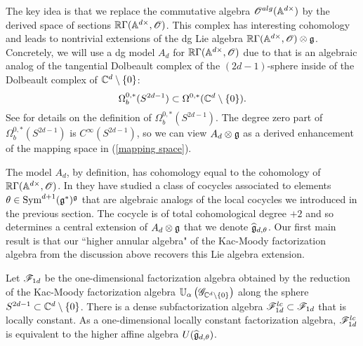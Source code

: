 \documentclass[10pt]{amsart}
\begin{document}
The key idea is that we replace the commutative algebra $\mathscr O^{alg}(\mathbb A^{d\times})$ by the derived space of sections $\mathbb R \Gamma(\mathbb A^{d \times}, \mathscr O)$. 
This complex has interesting cohomology and leads to nontrivial extensions of the dg Lie algebra $\mathbb R \Gamma(\mathbb A^{d \times}, \mathscr O) \otimes \mathfrak g$. 
Concretely, we will use a dg model $A_d$ for $\mathbb R \Gamma(\mathbb A^{d \times}, \mathscr O)$ due to \cite{FHK} that is an algebraic analog of the tangential Dolbeault complex of the $(2d-1)$-sphere inside of the Dolbeault complex of $\mathbb C^d \setminus \{0\}$:
\[
\Omega_b^{0,*}(S^{2d-1}) \subset \Omega^{0,*}(\mathbb C^d\setminus \{0\}) .
\]
See \cite{DragomirTomassini} for details on the definition of $\Omega_b^{0,*}(S^{2d-1})$. 
The degree zero part of $\Omega_b^{0,*}(S^{2d-1})$ is $C^\infty(S^{2d-1})$, so we can view $A_d \otimes \mathfrak g$ as a derived enhancement of the mapping space in (\ref{mapping space}). 

The model $A_d$, by definition, has cohomology equal to the cohomology of $\mathbb R \Gamma(\mathbb A^{d \times}, \mathscr O)$. 
In \cite{FHK} they have studied a class of cocycles associated to elements $\theta \in {\rm Sym}^{d+1}(\mathfrak g^*)^\mathfrak g$ that are algebraic analogs of the local cocycles we introduced in the previous section. 
The cocycle is of total cohomological degree $+2$ and so determines a central extension of $A_d \otimes \mathfrak g$ that we denote $\widehat{\mathfrak g}_{d,\theta}$. 
Our first main result is that our ``higher annular algebra" of the Kac-Moody factorization algebra from the discussion above recovers this Lie algebra extension.

\begin{thm}\label{thm sphere alg}
Let $\mathscr F_{1d}$ be the one-dimensional factorization algebra obtained by the reduction of the Kac-Moody factorization algebra $\mathbb U_\alpha\left(\mathscr G_{\mathbb C^{d} \setminus \{0\}} \right)$ along the sphere $S^{2d-1} \subset \mathbb C^{d} \setminus \{0\}$.
There is a dense subfactorization algebra $\mathscr F^{lc}_{1d} \subset \mathscr F_{1d}$ that is locally constant. 
As a one-dimensional locally constant factorization algebra, $\mathscr F^{lc}_{1d}$ is equivalent to the higher affine algebra $U(\widehat{\mathfrak g}_{d,\theta})$.
\end{thm}

\end{document}
